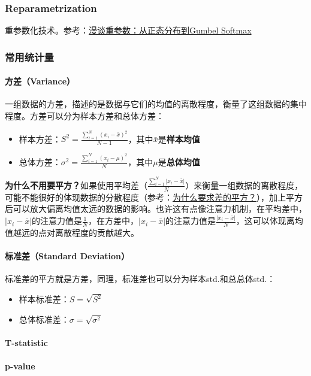 \subsubsection{Reparametrization}重参数化技术。参考：\href{https://spaces.ac.cn/archives/6705}{漫谈重参数：从正态分布到Gumbel Softmax}

\subsubsection{常用统计量}
\paragraph{方差（Variance）} 一组数据的方差，描述的是数据与它们的均值的离散程度，衡量了这组数据的集中程度。方差可以分为样本方差和总体方差：
\begin{itemize}
	\item 样本方差：$S^2 = \frac{\sum_{i=1}^N(x_i - \bar{x})^2}{N-1}$，其中$\bar{x}$是\textbf{样本均值}
	\item 总体方差：$\sigma^2 = \frac{\sum_{i=1}^N(x_i - \mu)^2}{N}$，其中$\mu$是\textbf{总体均值}
\end{itemize}
\textbf{为什么不用要平方？}如果使用平均差（$\frac{\sum_{i=1}^N |x_i - \bar{x}|}{N}$）来衡量一组数据的离散程度，可能不能很好的体现数据的分散程度（参考：\href{https://www.shuxuele.com/data/standard-deviation.html#WhySquare}{为什么要求差的平方？}），加上平方后可以放大偏离均值太远的数据的影响。也许这有点像注意力机制，在平均差中，$|x_i - \bar{x}|$的注意力值是$\frac{1}{N}$，在方差中，$|x_i - \bar{x}|$的注意力值是$\frac{|x_i - \bar{x}|}{N}$，这可以体现离均值越远的点对离散程度的贡献越大。

\paragraph{标准差（Standard Deviation）} 标准差的平方就是方差，同理，标准差也可以分为样本std.和总总体std.：
\begin{itemize}
	\item 样本标准差：$S = \sqrt{S^2}$
	\item 总体标准差：$\sigma = \sqrt{\sigma^2}$
\end{itemize}

\paragraph{T-statistic }


\paragraph{p-value }

